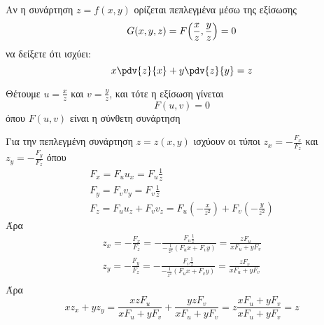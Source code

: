 \documentclass[a4paper,table]{report}
\begin{document}
\begin{mybox3}
  \begin{thema}

    Αν η συνάρτηση $ z=f(x,y) $ ορίζεται πεπλεγμένα μέσω της εξίσωσης 
    \[
      G(x,y,z) = F\Bigl(\frac{x}{z} , \frac{y}{z}\Bigr) = 0 
    \] 
    να δείξετε ότι ισχύει:
    \[
      x \pdv{z}{x} + y \pdv{z}{y} = z 
    \]
  \end{thema}
\end{mybox3}
\begin{solution}
  Θέτουμε $ u = \frac{x}{z} $ και $ v = \frac{y}{z} $, και τότε η εξίσωση γίνεται 
  \[
    F(u,v) = 0
  \] 
  όπου $ F(u,v) $ είναι η σύνθετη συνάρτηση 


  Για την πεπλεγμένη συνάρτηση $ z=z(x,y) $ ισχύουν οι τύποι 
  $ z_{x} = - \frac{F_{x}}{F_{z}} $ και $ z_{y} = -\frac{F_{y}}{F_{z}} $ 
  όπου
  \begin{gather*}
    F_{x}=F_{u}u_{x} = F_{u} \frac{1}{z} \\
    F_{y}=F_{v}v_{y} = F_{v} \frac{1}{z} \\
    F_{z} = F_{u}u_{z}+F_{v}v_{z} = F_{u} (- \frac{x}{z^{2}}) + F_{v} (-
    \frac{y}{z^{2}})
  \end{gather*}
  Άρα 
  \begin{gather*}
    z_{x} = - \frac{F_{x}}{F_{z}} = - \frac{F_{u} \frac{1}{z}}{-\frac{1}{z^{2}}
    (F_{u}x+F_{v}y)} = \frac{zF_{u}}{xF_{u}+yF_{v}}   \\
    z_{y} = - \frac{F_{y}}{F_{z}} = - \frac{F_{v} \frac{1}{z}}{-\frac{1}{z^{2}}
    (F_{u}x+F_{v}y)} = \frac{zF_{v}}{xF_{u}+yF_{v}}   \\
  \end{gather*}  
  Άρα 
  \[
    xz_{x}+yz_{y} = \frac{xzF_{u}}{xF_{u}+yF_{v}}+ \frac{yzF_{v}}{xF_{u}+yF_{v}} = z
    \frac{xF_{u}+yF_{v}}{xF_{u}+yF_{v}} = z
  \]
\end{solution}
\end{document}
